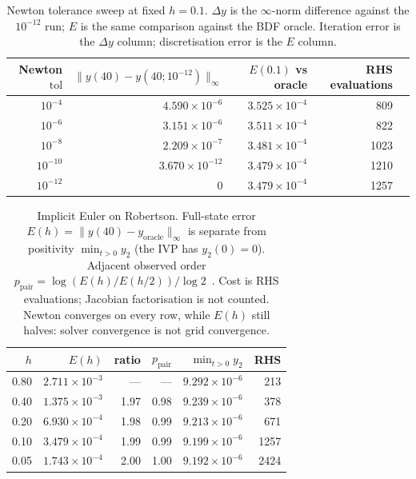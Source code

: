 \documentclass[11pt,a4paper]{article}
\begin{document}
\begin{table}[ht]
\centering
\caption{Newton tolerance sweep at fixed \(h=0.1\). \(\Delta y\) is the \(\infty\)-norm difference against the \(10^{-12}\) run; \(E\) is the same comparison against the BDF oracle. Iteration error is the \(\Delta y\) column; discretisation error is the \(E\) column.}
\label{tab:newton}
\begin{tabular}{@{}rrrrr@{}}
\toprule
Newton \(\mathrm{tol}\) & \(\|y(40)-y(40;10^{-12})\|_\infty\) & \(E(0.1)\) vs oracle & RHS evaluations\\
\midrule
\(10^{-4}\) & \(4.590\times 10^{-6}\) & \(3.525\times 10^{-4}\) & 809\\
\(10^{-6}\) & \(3.151\times 10^{-6}\) & \(3.511\times 10^{-4}\) & 822\\
\(10^{-8}\) & \(2.209\times 10^{-7}\) & \(3.481\times 10^{-4}\) & 1023\\
\(10^{-10}\) & \(3.670\times 10^{-12}\) & \(3.479\times 10^{-4}\) & 1210\\
\(10^{-12}\) & \(0\) & \(3.479\times 10^{-4}\) & 1257\\
\bottomrule
\end{tabular}
\end{table}

\begin{table}[ht]
\centering
\caption{Implicit Euler on Robertson. Full-state error \(E(h)=\|y(40)-y_{\mathrm{oracle}}\|_\infty\) is separate from positivity \(\min_{t>0}y_2\) (the IVP has \(y_2(0)=0\)). Adjacent observed order \(p_{\mathrm{pair}}=\log(E(h)/E(h/2))/\log 2\)~\cite{tutorial3supp}. Cost is RHS evaluations; Jacobian factorisation is not counted. Newton converges on every row, while \(E(h)\) still halves: solver convergence is not grid convergence.}
\label{tab:rob}
\begin{tabular}{@{}rrrrrr@{}}
\toprule
\(h\) & \(E(h)\) & ratio & \(p_{\mathrm{pair}}\) & \(\min_{t>0}y_2\) & RHS\\
\midrule
0.80 & \(2.711\times 10^{-3}\) & --- & --- & \(9.292\times 10^{-6}\) & 213\\
0.40 & \(1.375\times 10^{-3}\) & 1.97 & 0.98 & \(9.239\times 10^{-6}\) & 378\\
0.20 & \(6.930\times 10^{-4}\) & 1.98 & 0.99 & \(9.213\times 10^{-6}\) & 671\\
0.10 & \(3.479\times 10^{-4}\) & 1.99 & 0.99 & \(9.199\times 10^{-6}\) & 1257\\
0.05 & \(1.743\times 10^{-4}\) & 2.00 & 1.00 & \(9.192\times 10^{-6}\) & 2424\\
\bottomrule
\end{tabular}
\end{table}
\end{document}
